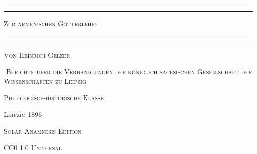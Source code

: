 \documentclass{article}
\begin{document}
\begin{titlepage} %
	\centering %


	\rule{\textwidth}{1.6pt}\vspace*{-\baselineskip}\vspace*{2pt} %
	\rule{\textwidth}{0.4pt} %
	
	\vspace{1\baselineskip} %
	
	{\scshape\Huge Zur armenischen Götterlehre}
	
	\vspace{1\baselineskip} %

	\rule{\textwidth}{0.4pt}\vspace*{-\baselineskip}\vspace{3.2pt} %
	\rule{\textwidth}{1.6pt} %
	
	\vspace{1\baselineskip} %
	
	
        {\scshape Von \large Heinrich Gelzer}
 
        \vspace{1.0\baselineskip}

‌        {\scshape\small Berichte über die Verhandlungen der königlich sächsischen Gesellschaft der Wissenschaften zu Leipzig}

        \vspace*{\fill}    

        \vspace{1.0\baselineskip}

        {\scshape Philologisch-historische Klasse}
        
	\vspace{1\baselineskip}

        {\scshape\small Leipzig 1896}
		
	\vspace{0.25\baselineskip} %

        {\scshape\small Solar Anamnesis Edition}%
    
	{\scshape\footnotesize CC0 1.0 Universal } %
\end{titlepage}
\clearpage
\tableofcontents
\clearpage
\end{document}
